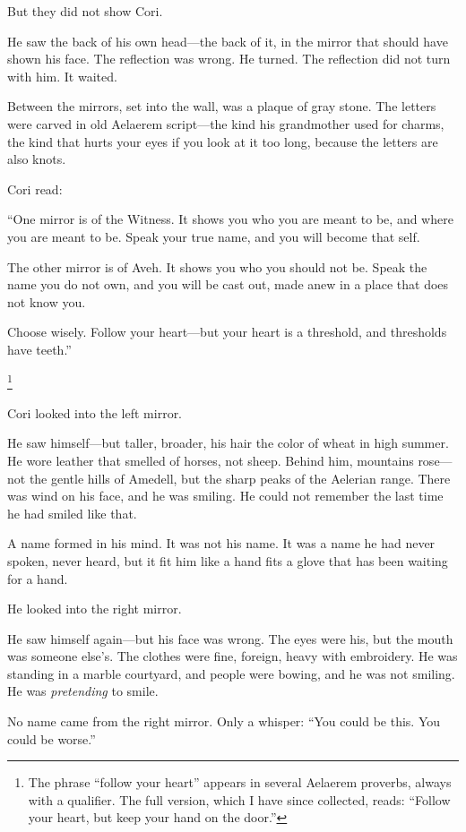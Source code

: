 \documentclass[12pt]{article}
\begin{document}
But they did not show Cori.

He saw the back of his own head---the back of it, in the mirror that should have shown his face. The reflection was wrong. He turned. The reflection did not turn with him. It waited.

Between the mirrors, set into the wall, was a plaque of gray stone. The letters were carved in old Aelaerem script---the kind his grandmother used for charms, the kind that hurts your eyes if you look at it too long, because the letters are also knots.

Cori read:

``One mirror is of the Witness. It shows you who you are meant to be, and where you are meant to be. Speak your true name, and you will become that self.

The other mirror is of Aveh. It shows you who you should not be. Speak the name you do not own, and you will be cast out, made anew in a place that does not know you.

Choose wisely. Follow your heart---but your heart is a threshold, and thresholds have teeth.''

\footnote{The phrase ``follow your heart'' appears in several Aelaerem proverbs, always with a qualifier. The full version, which I have since collected, reads: ``Follow your heart, but keep your hand on the door.''}

Cori looked into the left mirror.

He saw himself---but taller, broader, his hair the color of wheat in high summer. He wore leather that smelled of horses, not sheep. Behind him, mountains rose---not the gentle hills of Amedell, but the sharp peaks of the Aelerian range. There was wind on his face, and he was smiling. He could not remember the last time he had smiled like that.

A name formed in his mind. It was not his name. It was a name he had never spoken, never heard, but it fit him like a hand fits a glove that has been waiting for a hand.

He looked into the right mirror.

He saw himself again---but his face was wrong. The eyes were his, but the mouth was someone else's. The clothes were fine, foreign, heavy with embroidery. He was standing in a marble courtyard, and people were bowing, and he was not smiling. He was \textit{pretending} to smile.

No name came from the right mirror. Only a whisper: ``You could be this. You could be worse.''
\end{document}
